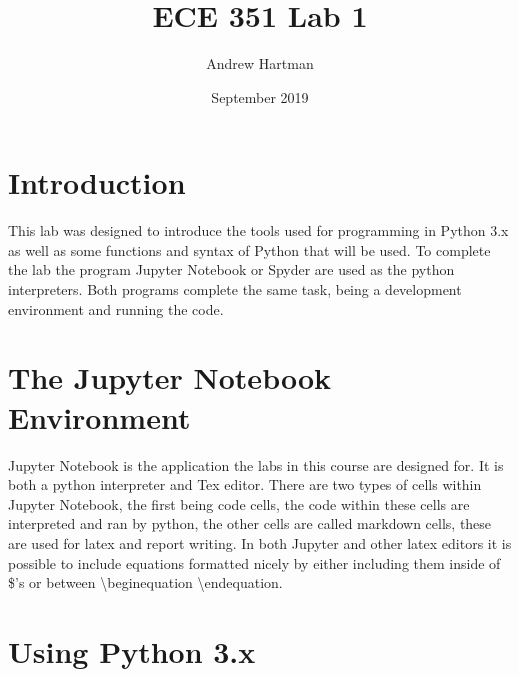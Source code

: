 \documentclass{article}
\title{ECE 351 Lab 1}
\author{Andrew Hartman }
\date{September 2019}
\begin{document}
\begin{titlepage}
\maketitle
\thispagestyle{empty}
\end{titlepage}

\tableofcontents
\newpage


\section{Introduction}
This lab was designed to introduce the tools used for programming in Python 3.x as well as some functions and syntax of Python that will be used. To complete the lab the program Jupyter Notebook or Spyder are used as the python interpreters. Both programs complete the same task, being a development environment and running the code. 

\section{The Jupyter Notebook Environment}
Jupyter Notebook is the application the labs in this course are designed for. It is both a python interpreter and Tex editor. There are two types of cells within Jupyter Notebook, the first being code cells, the code within these cells are interpreted and ran by python, the other cells are called markdown cells, these are used for latex and report writing. In both Jupyter and other latex editors it is possible to include equations formatted nicely by either including them inside of \$'s or between \textbackslash begin{equation} \textbackslash end{equation}.
\section{Using Python 3.x}
\end{document}
